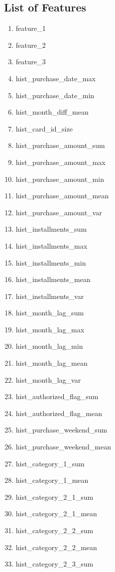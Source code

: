 \documentclass{article}
\begin{document}
\newpage

\subsection{List of Features}

\begin{enumerate}
\item feature\_1
\item feature\_2
\item feature\_3
\item hist\_purchase\_date\_max
\item hist\_purchase\_date\_min
\item hist\_month\_diff\_mean
\item hist\_card\_id\_size
\item hist\_purchase\_amount\_sum
\item hist\_purchase\_amount\_max
\item hist\_purchase\_amount\_min
\item hist\_purchase\_amount\_mean
\item hist\_purchase\_amount\_var
\item hist\_installments\_sum
\item hist\_installments\_max
\item hist\_installments\_min
\item hist\_installments\_mean
\item hist\_installments\_var
\item hist\_month\_lag\_sum
\item hist\_month\_lag\_max
\item hist\_month\_lag\_min
\item hist\_month\_lag\_mean
\item hist\_month\_lag\_var
\item hist\_authorized\_flag\_sum
\item hist\_authorized\_flag\_mean
\item hist\_purchase\_weekend\_sum
\item hist\_purchase\_weekend\_mean
\item hist\_category\_1\_sum
\item hist\_category\_1\_mean
\item hist\_category\_2\_1\_sum
\item hist\_category\_2\_1\_mean
\item hist\_category\_2\_2\_sum
\item hist\_category\_2\_2\_mean
\item hist\_category\_2\_3\_sum

\end{enumerate}
\end{document}

